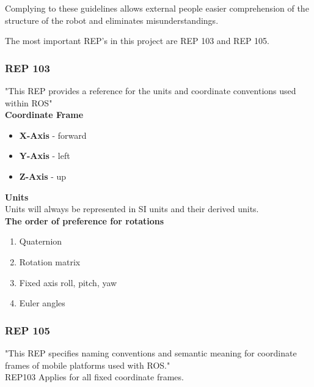Complying to these guidelines allows external people easier comprehension of the structure of the robot and eliminates misunderstandings.

The most important REP's in this project are REP 103 and REP 105.
\subsubsection{REP 103}
	
	"This REP provides a reference for the units and coordinate conventions used within ROS"\cite{REP103}\\  
	
	\textbf{Coordinate Frame}
	\begin{itemize}
		\item \textbf{X-Axis} - forward
		\item \textbf{Y-Axis} - left
		\item \textbf{Z-Axis} - up
	\end{itemize}
	
	\textbf{Units}\\
	
	Units will always be represented in SI units and their derived units.\\
	
	\textbf{The order of preference for rotations}
	\begin{enumerate}
		\item Quaternion
		\item Rotation matrix
		\item Fixed axis roll, pitch, yaw
		\item Euler angles
	\end{enumerate}
	\cite{REP103}
	
\subsubsection{REP 105}
	"This REP specifies naming conventions and semantic meaning for coordinate frames of mobile platforms used with ROS."\cite{REP105}\\
	
	REP103 Applies for all fixed coordinate frames.
	
